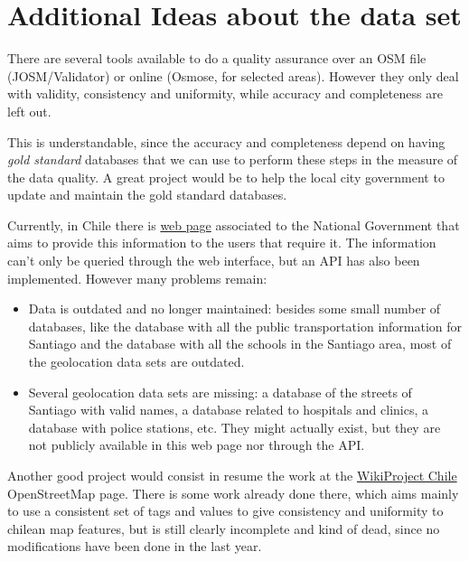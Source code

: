 \documentclass[a4paper,10pt,english]{sphinxhowto}
\begin{document}
\section{Additional Ideas about the data set}
\label{index:additional-ideas-about-the-data-set}
There are several tools available to do a quality assurance over an OSM file
(JOSM/Validator) or online (Osmose, for selected areas). However they only deal
with validity, consistency and uniformity, while accuracy and completeness are
left out.

This is understandable, since the accuracy and completeness depend on having
\emph{gold standard} databases that we can use to perform these steps in the measure
of the data quality. A great project would be to help the local city government
to update and maintain the gold standard databases.

Currently, in Chile there is \href{http://datos.gob.cl}{web page} associated to the
National Government that aims to provide this information to the users that
require it. The information can't only be queried through the web interface, but
an API has also been implemented. However many problems remain:
\begin{itemize}
\item {} 
Data is outdated and no longer maintained: besides some small number of
databases, like the database with all the public transportation information
for Santiago and the database with all the schools in the Santiago area, most
of the geolocation data sets are outdated.

\item {} 
Several geolocation data sets are missing: a database of the streets of Santiago
with valid names, a database related to hospitals and clinics, a database with
police stations, etc. They might actually exist, but they are not publicly
available in this web page nor through the API.

\end{itemize}

Another good project would consist in resume the work at the
\href{http://wiki.openstreetmap.org/wiki/WikiProject\_Chile}{WikiProject Chile}
OpenStreetMap page. There is some work already done there, which aims mainly to
use a consistent set of tags and values to give consistency and uniformity to
chilean map features, but is still clearly incomplete and kind of dead, since
no modifications have been done in the last year.



\renewcommand{\indexname}{Index}
\printindex
\end{document}
